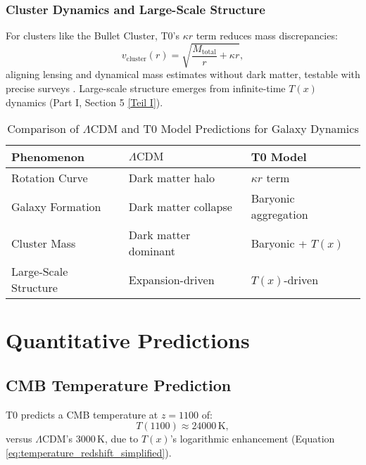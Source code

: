 \documentclass[twocolumn,aps,prl]{revtex4-2}
\newcommand{\Tfield}{T(x)}
\newcommand{\LCDM}{\Lambda\text{CDM}}
\begin{document}
	\subsubsection{Cluster Dynamics and Large-Scale Structure}
	For clusters like the Bullet Cluster, T0’s \(\kappa r\) term reduces mass discrepancies:
	\begin{equation}
		v_{\text{cluster}}(r) = \sqrt{\frac{M_{\text{total}}}{r} + \kappa r},
		\label{eq:cluster_velocity}
	\end{equation}
	aligning lensing and dynamical mass estimates without dark matter, testable with precise surveys \cite{pascher_emergente_2025}. Large-scale structure emerges from infinite-time \(\Tfield\) dynamics (Part I, Section 5 \href{https://github.com/jpascher/T0-Time-Mass-Duality/tree/main/2/pdf/English/QMRelTimeMassPart1En.pdf}{[Teil I]}).
	
	\begin{table}[ht]
		\centering
		\caption{Comparison of \(\LCDM\) and T0 Model Predictions for Galaxy Dynamics}
		\label{tab:galaxy_dynamics_comparison}
		\small
		\begin{tabular}{p{} p{} p{}}
			\hline
			\textbf{Phenomenon} & \textbf{\(\LCDM\)} & \textbf{T0 Model} \\
			\hline
			Rotation Curve & Dark matter halo & \(\kappa r\) term \\
			Galaxy Formation & Dark matter collapse & Baryonic aggregation \\
			Cluster Mass & Dark matter dominant & Baryonic + \(\Tfield\) \\
			Large-Scale Structure & Expansion-driven & \(\Tfield\)-driven \\
			\hline
		\end{tabular}
	\end{table}
	
	\section{Quantitative Predictions}
	\label{sec:predictions}
	
	\subsection{CMB Temperature Prediction}
	\label{subsec:cmb_temp_prediction}
	
	T0 predicts a CMB temperature at \(z = 1100\) of:
	\begin{equation}
		T(1100) \approx 24000 \, \text{K},
		\label{eq:cmb_temp_t0}
	\end{equation}
	versus \(\LCDM\)’s \(3000 \, \text{K}\), due to \(\Tfield\)’s logarithmic enhancement (Equation \ref{eq:temperature_redshift_simplified}).
	
\end{document}
